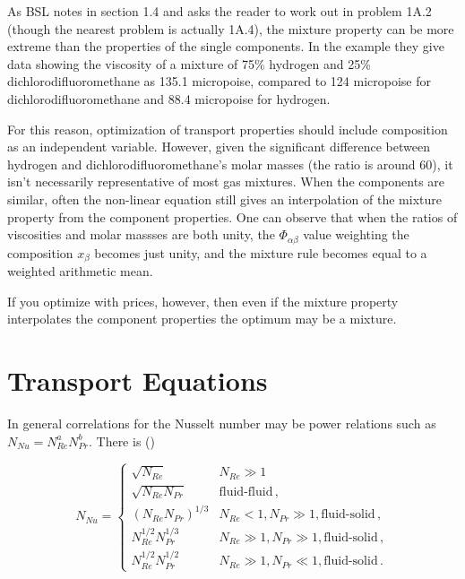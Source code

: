 \documentclass{article}
\begin{document}
As BSL notes in section 1.4 and asks the reader to work out in problem
1A.2 (though the nearest problem is actually 1A.4), the mixture property
can be more extreme than the properties of the single components. In the
example they give data showing the viscosity of a mixture of 75\%
hydrogen and 25\% dichlorodifluoromethane as 135.1 micropoise, compared
to 124 micropoise for dichlorodifluoromethane and 88.4 micropoise for
hydrogen.

For this reason, optimization of transport properties should include
composition as an independent variable. However, given the significant
difference between hydrogen and dichlorodifluoromethane's molar masses
(the ratio is around 60), it isn't necessarily representative of most
gas mixtures. When the components are similar, often the non-linear
equation still gives an interpolation of the mixture property from
the component properties. One can observe that when the ratios of
viscosities and molar massses are both unity, the $\Phi_{\alpha\beta}$
value weighting the composition $x_\beta$ becomes just unity, and the
mixture rule becomes equal to a weighted arithmetic mean.

If you optimize with prices, however, then even if the mixture property
interpolates the component properties the optimum may be a mixture.

\section{Transport Equations}\label{sec:transport-eqns}

In general correlations for the Nusselt number may be power relations
such as $N_{Nu} = N_{Re}^a N_{Pr}^b$. There is (\cite[eqn.~11.4-2]{deen1998analysis})

\begin{equation}
N_{Nu} = \begin{cases}
\sqrt{N_{Re}} & N_{Re} \gg 1 \\
\sqrt{N_{Re}N_{Pr}} & \text{fluid-fluid} \,,\\
(N_{Re} N_{Pr})^{1/3} & N_{Re} < 1, N_{Pr} \gg 1, \text{fluid-solid}\,,\\
N_{Re}^{1/2} N_{Pr}^{1/3} & N_{Re} \gg 1, N_{Pr} \gg 1, \text{fluid-solid}\,,\\
N_{Re}^{1/2} N_{Pr}^{1/2} & N_{Re} \gg 1, N_{Pr} \ll 1, \text{fluid-solid}\,.
\end{cases} \label{eqn:Nu-corrs}
\end{equation}

\end{document}
